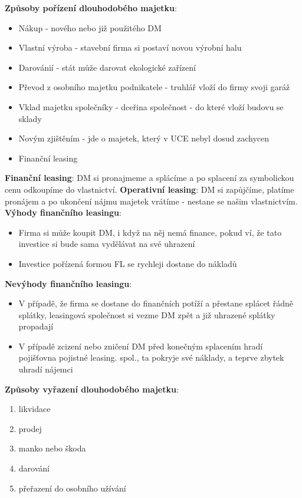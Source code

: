 \documentclass[11pt,a4paper,twoside]{book}
\begin{document}
	\textbf{Způsoby pořízení dlouhodobého majetku}:
	\begin{itemize}
		\item Nákup - nového nebo již použitého DM
		\item Vlastní výroba - stavební firma si postaví novou výrobní halu
		\item Darovánií - stát může darovat ekologické zařízení
		\item Převod z osobního majetku podnikatele - truhlář vloží do firmy svoji garáž
		\item Vklad majetku společníky - dceřina společnost - do které vloží budovu se sklady
		\item Novým zjištěním - jde o majetek, který v UCE nebyl dosud zachycen
		\item Finanční leasing
	\end{itemize}

	\textbf{Finanční leasing}: DM si pronajmeme a splácíme a po splacení za symbolickou cenu odkoupíme do vlastnictví.
	\textbf{Operativní leasing}: DM si zapůjčíme, platíme pronájem a po ukončení nájmu majetek vrátíme - nestane se našim vlastnictvím.
	\textbf{Výhody finančního leasingu}:
	\begin{itemize}
		\item Firma si může koupit DM, i když na něj nemá finance, pokud ví, že tato investice si bude sama vydělávat na své uhrazení
		\item Investice pořízená formou FL se rychleji dostane do nákladů
	\end{itemize}

	\textbf{Nevýhody finančního leasingu}:
	\begin{itemize}
		\item V případě, že firma se dostane do finančních potíží a přestane splácet řádně splátky, leasingová společnost si vezme DM zpět a již uhrazené splátky propadají
		\item V případě zcizení nebo zničení DM před konečným splacením hradí pojišťovna pojistné leasing. spol., ta pokryje své náklady, a teprve zbytek uhradí nájemci
	\end{itemize}

	\textbf{Způsoby vyřazení dlouhodobého majetku}:
	\begin{enumerate}
		\item likvidace
		\item prodej
		\item manko nebo škoda
		\item darování
		\item přeřazení do osobního užívání
	\end{enumerate}
\end{document}
